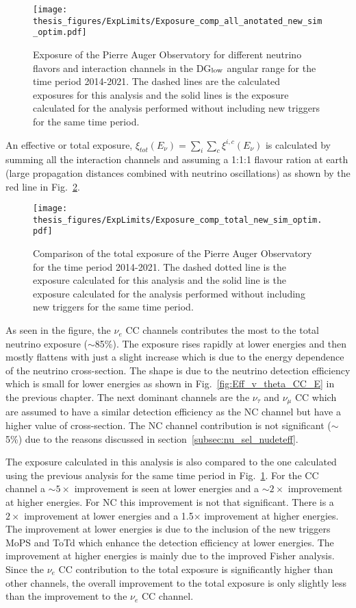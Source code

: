 \begin{figure}[t!]
  \centering
  \texttt{[image: thesis\_figures/ExpLimits/Exposure\_comp\_all\_anotated\_new\_sim\_optim.pdf]}
  \caption{Exposure of the Pierre Auger Observatory for different neutrino flavors and interaction channels in the DG$_{\text{\text{low}}}$ angular range for the time period 2014-2021. The dashed lines are the calculated exposures for this analysis and the solid lines is the exposure calculated for the analysis performed without including new triggers for the same time period.}
  \label{fig:Exp_flavors_comp}
\end{figure}

An effective or total exposure, $\xi_{tot}(E_{\nu}) = \sum_{i}\sum_{c} \xi^{i,c}(E_{\nu})$ is calculated by summing all the interaction channels and assuming a 1:1:1 flavour ration at earth (large propagation distances combined with neutrino oscillations) as shown by the red line in Fig.~\ref{fig:Exp_total_comp}. 

\begin{figure}[t!]
  \centering
  \texttt{[image: thesis\_figures/ExpLimits/Exposure\_comp\_total\_new\_sim\_optim.pdf]}
  \caption{Comparison of the total exposure of the Pierre Auger Observatory for the time period 2014-2021. The dashed dotted line is the exposure calculated for this analysis and the solid line is the exposure calculated for the analysis performed without including new triggers for the same time period.}
  \label{fig:Exp_total_comp}
\end{figure}

As seen in the figure, the $\nu_e$ CC channels contributes the most to the total neutrino exposure ($\sim$85\%). The exposure rises rapidly at lower energies and then mostly flattens with just a slight increase which is due to the energy dependence of the neutrino cross-section. The shape is due to the neutrino detection efficiency which is small for lower energies as shown in Fig.~\ref{fig:Eff_v_theta_CC_E} in the previous chapter. The next dominant channels are the $\nu_{\tau}$ and $\nu_{\mu}$ CC which are assumed to have a similar detection efficiency as the NC channel but have a higher value of cross-section. The NC channel contribution is not significant ($\sim$5\%) due to the reasons discussed in section~\ref{subsec:nu_sel_nudeteff}.  

The exposure calculated in this analysis is also compared to the one calculated using the previous analysis for the same time period in Fig.~\ref{fig:Exp_flavors_comp}. For the CC channel a $\sim 5 \times$ improvement is seen at lower energies and a $\sim 2\times$ improvement at higher energies. For NC this improvement is not that significant. There is a $2\times$ improvement at lower energies and a 1.5$\times$ improvement at higher energies. The improvement at lower energies is due to the inclusion of the new triggers MoPS and ToTd which enhance the detection efficiency at lower energies. The improvement at higher energies is mainly due to the improved Fisher analysis. Since the $\nu_e$ CC contribution to the total exposure is significantly higher than other channels, the overall improvement to the total exposure is only slightly less than the improvement to the $\nu_e$ CC channel. 

